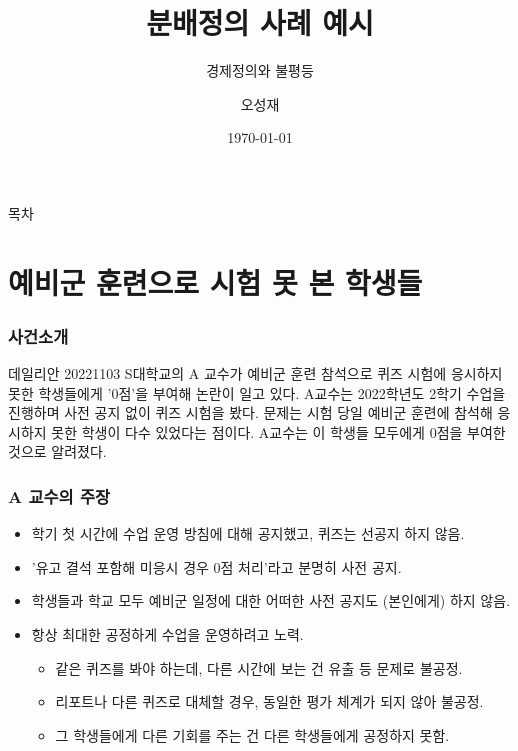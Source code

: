 \documentclass[aspectratio=169,xcolor=dvipsnames,]{beamer}
\title[분배정의 사례 예시]{분배정의 사례 예시}
\subtitle{경제정의와 불평등}
\author[오성재]{오성재}
\institute[HNU] %
{
    한남대학교 \\
    탈메이지 교양학부 \\
}
\date{\today}
\begin{document}
\begin{frame}
    \titlepage
\end{frame}

\begin{frame}{목차}
    \tableofcontents
\end{frame}

\section{예비군 훈련으로 시험 못 본 학생들}

\begin{frame}[<+->]
\frametitle{사건소개}
    \begin{exampleblock}{데일리안 20221103}
        S대학교의 A 교수가 예비군 훈련 참석으로 퀴즈 시험에 응시하지 못한 학생들에게 '0점'을 부여해 논란이 일고 있다.
        A교수는 2022학년도 2학기 수업을 진행하며 사전 공지 없이 퀴즈 시험을 봤다.
        문제는 시험 당일 예비군 훈련에 참석해 응시하지 못한 학생이 다수 있었다는 점이다.
        A교수는 이 학생들 모두에게 0점을 부여한 것으로 알려졌다. 
    \end{exampleblock}
\end{frame}

\begin{frame}[<+->]
\frametitle{A 교수의 주장}
    \begin{itemize}
        \item 학기 첫 시간에 수업 운영 방침에 대해 공지했고, 퀴즈는 선공지 하지 않음.
        \item '유고 결석 포함해 미응시 경우 0점 처리'라고 분명히 사전 공지.
        \item 학생들과 학교 모두 예비군 일정에 대한 어떠한 사전 공지도 (본인에게) 하지 않음.
        \item 항상 최대한 공정하게 수업을 운영하려고 노력.
        \begin{itemize}
            \item 같은 퀴즈를 봐야 하는데, 다른 시간에 보는 건 유출 등 문제로 불공정.
            \item 리포트나 다른 퀴즈로 대체할 경우, 동일한 평가 체계가 되지 않아 불공정.
            \item 그 학생들에게 다른 기회를 주는 건 다른 학생들에게 공정하지 못함.
        \end{itemize}
    \end{itemize}
\end{frame}
\end{document}
